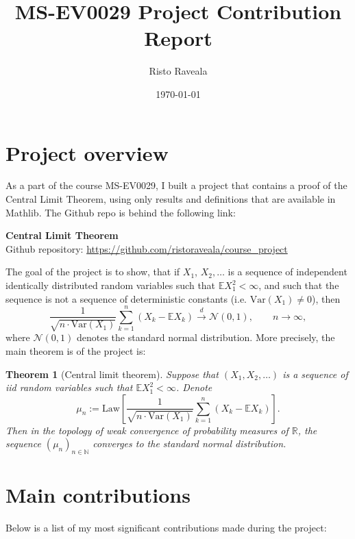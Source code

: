 \documentclass[12pt]{article}
\title{MS-EV0029 Project Contribution Report}
\author{Risto Raveala}
\date{\today}
\newtheorem{theorem}{Theorem}
\begin{document}
\maketitle


\section*{Project overview}
As a part of the course MS-EV0029, I built a project that contains a proof of the Central Limit Theorem, using only results and definitions that are available in Mathlib. The Github repo is behind the following link:
\begin{center}
\textbf{Central Limit Theorem} \\
Github repository: \url{https://github.com/ristoraveala/course_project}
\end{center}

The goal of the project is to show, that if $X_1$, $X_2,\ldots$ is a sequence of independent identically distributed random variables such that $\mathbb{E} X_1^2 < \infty$, and such that the sequence is not a sequence of deterministic constants (i.e. $\textrm{Var} (X_1) \ne 0$), then
\[
\frac{1}{\sqrt{n \cdot \textrm{Var} (X_1)}} \sum_{k=1}^n (X_k - \mathbb{E} X_k) \overset{d}{\longrightarrow} \mathcal{N}(0,1), \qquad n \to \infty,
\]
where $\mathcal{N}(0,1)$ denotes the standard normal distribution. More precisely, the main theorem is of the project is:

\begin{theorem}[Central limit theorem]
Suppose that $(X_1,X_2,\ldots)$ is a sequence of iid random variables such that $\mathbb{E} X_1^2 < \infty$. Denote
\[
\mu_n := \textrm{Law} \left[\frac{1}{\sqrt{n \cdot \textrm{Var} (X_1)}} \sum_{k=1}^n (X_k - \mathbb{E} X_k) \right].
\]
Then in the topology of weak convergence of probability measures of $\mathbb{R}$, the sequence $(\mu_n)_{n\in\mathbb{N}}$ converges to the standard normal distribution.
\end{theorem}


\section*{Main contributions}
Below is a list of my most significant contributions made during the project:
\end{document}
